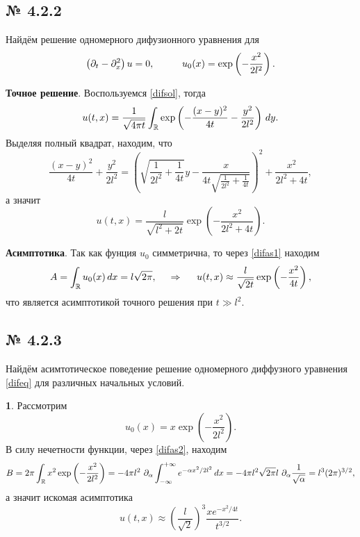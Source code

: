\subsection*{№ 4.2.2}

Найдём решение одномерного дифузионного уравнения для 
\begin{equation*}
    \left(\partial_t - \partial_x^2\right) u = 0,
    \hspace{10 mm} 
    u_0(x) = \exp\left(- \frac{x^2}{2l^2}\right).
\end{equation*}

\textbf{Точное решение}. Воспользуемся \eqref{difsol}, тогда
\begin{equation*}
    u(t, x) = \frac{1}{\sqrt{4 \pi t}}\int_{\mathbb{R}} \exp\left(
        - \frac{(x-y)^2}{4 t} - \frac{y^2}{2 l^2}
    \right) \, d y.
\end{equation*}
Выделяя полный квадрат, находим, что
\begin{equation*}
    \frac{(x-y)^2}{4 t} + \frac{y^2}{2 l^2} = \left(\sqrt{\frac{1}{2 l^2} + \frac{1}{4 t}} y -\frac{x}{4 t \sqrt{\frac{1}{2 l^2}+\frac{1}{4 t}}}\right)^2+\frac{x^2}{2 l^2+4 t},
\end{equation*}
а значит
\begin{equation*}
    u(t, x) = \frac{l}{\sqrt{l^2 + 2 t}} \exp\left(
        - \frac{x^2}{2 l^2 + 4 t}
    \right).
\end{equation*}


\textbf{Асимптотика}. Так как фунция $u_0$ симметрична, то через \eqref{difas1} находим
\begin{equation*}
    A = \int_{\mathbb{R}} u_0 (x) \, d x = l \sqrt{2 \pi},
    \hspace{0.5cm} \Rightarrow \hspace{0.5cm}
    u(t, x) \approx \frac{l}{\sqrt{2 t}} \exp\left(- \frac{x^2}{4 t}\right),
\end{equation*}
что является асимптотикой точного решения при $t \gg l^2$.




\subsection*{№ 4.2.3}

Найдём асимтотическое поведение решение одномерного диффузного уравнения \eqref{difeq} для различных начальных условий.

\textbf{1}. Рассмотрим
\begin{equation*}
    u_0 (x) = x \exp\left(- \frac{x^2}{2l^2}\right).
\end{equation*}
В силу нечетности функции, через \eqref{difas2}, находим
\begin{equation*}
    B = 2 \pi \int_{ \mathbb{R}} x^2 \exp\left(- \frac{x^2}{2l^2}\right) =
    -4 \pi l^2 \ \partial_\alpha \int_{-\infty}^{+\infty} e^{- \alpha x^2 / 2 l^2} \, d x = 
    -4 \pi l^2 \sqrt{2 \pi} l  \ \partial_\alpha \frac{1}{\sqrt{\alpha}} = l^3  (2\pi)^{3/2},
\end{equation*}
а значит искомая асимптотика
\begin{equation*}
    u(t, x) \approx \left(\frac{l}{\sqrt{2}}\right)^3  \frac{x e^{-{x^2}/{4 t}}}{t^{3/2}}.
\end{equation*}

